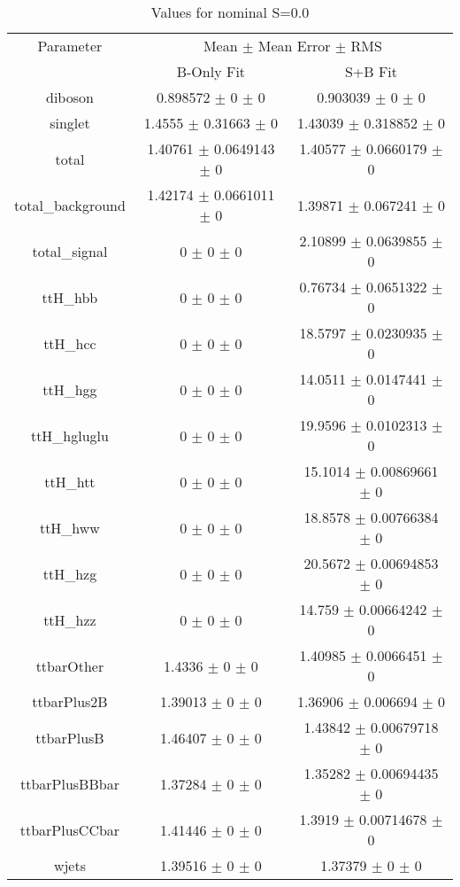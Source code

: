 \begin{table}
\centering
\caption{Values for nominal S=0.0}
\begin{tabular}{ccc}
\toprule
Parameter & \multicolumn{2}{c}{Mean $\pm$ Mean Error $\pm$ RMS}\\
 & B-Only Fit & S+B Fit\\
\midrule
diboson & \num{0.898572} $\pm$ \num{0} $\pm$ \num{0} & \num{0.903039} $\pm$ \num{0} $\pm$ \num{0}\\
singlet & \num{1.4555} $\pm$ \num{0.31663} $\pm$ \num{0} & \num{1.43039} $\pm$ \num{0.318852} $\pm$ \num{0}\\
total & \num{1.40761} $\pm$ \num{0.0649143} $\pm$ \num{0} & \num{1.40577} $\pm$ \num{0.0660179} $\pm$ \num{0}\\
total\_background & \num{1.42174} $\pm$ \num{0.0661011} $\pm$ \num{0} & \num{1.39871} $\pm$ \num{0.067241} $\pm$ \num{0}\\
total\_signal & \num{0} $\pm$ \num{0} $\pm$ \num{0} & \num{2.10899} $\pm$ \num{0.0639855} $\pm$ \num{0}\\
ttH\_hbb & \num{0} $\pm$ \num{0} $\pm$ \num{0} & \num{0.76734} $\pm$ \num{0.0651322} $\pm$ \num{0}\\
ttH\_hcc & \num{0} $\pm$ \num{0} $\pm$ \num{0} & \num{18.5797} $\pm$ \num{0.0230935} $\pm$ \num{0}\\
ttH\_hgg & \num{0} $\pm$ \num{0} $\pm$ \num{0} & \num{14.0511} $\pm$ \num{0.0147441} $\pm$ \num{0}\\
ttH\_hgluglu & \num{0} $\pm$ \num{0} $\pm$ \num{0} & \num{19.9596} $\pm$ \num{0.0102313} $\pm$ \num{0}\\
ttH\_htt & \num{0} $\pm$ \num{0} $\pm$ \num{0} & \num{15.1014} $\pm$ \num{0.00869661} $\pm$ \num{0}\\
ttH\_hww & \num{0} $\pm$ \num{0} $\pm$ \num{0} & \num{18.8578} $\pm$ \num{0.00766384} $\pm$ \num{0}\\
ttH\_hzg & \num{0} $\pm$ \num{0} $\pm$ \num{0} & \num{20.5672} $\pm$ \num{0.00694853} $\pm$ \num{0}\\
ttH\_hzz & \num{0} $\pm$ \num{0} $\pm$ \num{0} & \num{14.759} $\pm$ \num{0.00664242} $\pm$ \num{0}\\
ttbarOther & \num{1.4336} $\pm$ \num{0} $\pm$ \num{0} & \num{1.40985} $\pm$ \num{0.0066451} $\pm$ \num{0}\\
ttbarPlus2B & \num{1.39013} $\pm$ \num{0} $\pm$ \num{0} & \num{1.36906} $\pm$ \num{0.006694} $\pm$ \num{0}\\
ttbarPlusB & \num{1.46407} $\pm$ \num{0} $\pm$ \num{0} & \num{1.43842} $\pm$ \num{0.00679718} $\pm$ \num{0}\\
ttbarPlusBBbar & \num{1.37284} $\pm$ \num{0} $\pm$ \num{0} & \num{1.35282} $\pm$ \num{0.00694435} $\pm$ \num{0}\\
ttbarPlusCCbar & \num{1.41446} $\pm$ \num{0} $\pm$ \num{0} & \num{1.3919} $\pm$ \num{0.00714678} $\pm$ \num{0}\\
wjets & \num{1.39516} $\pm$ \num{0} $\pm$ \num{0} & \num{1.37379} $\pm$ \num{0} $\pm$ \num{0}\\
\bottomrule
\end{tabular}
\end{table}